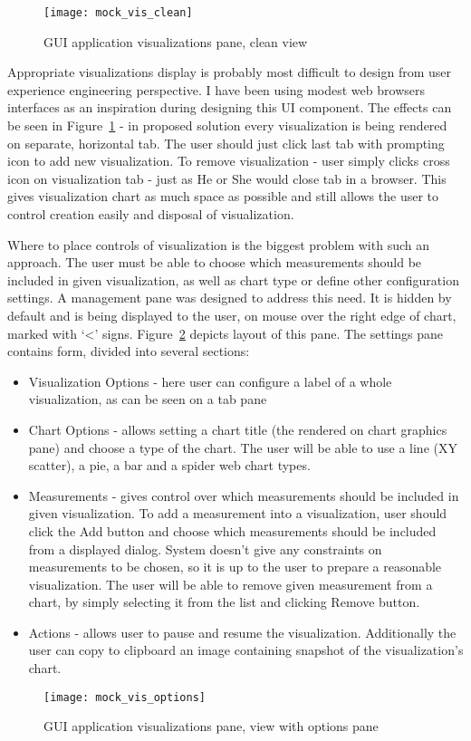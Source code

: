 \begin{figure}[ht]
\centering
\texttt{[image: mock\_vis\_clean]}
\caption{GUI application visualizations pane, clean view}
\label{fig:mock_vis_clean}
\end{figure}

Appropriate visualizations display is probably most difficult to design from user experience engineering perspective. I have been using modest web browsers interfaces as an inspiration during designing this UI component. The effects can be seen in Figure~\ref{fig:mock_vis_clean} - in proposed solution every visualization is being rendered on separate, horizontal tab. The user should just click last tab with prompting icon to add new visualization. To remove visualization - user simply clicks cross icon on visualization tab - just as He or She would close tab in a browser. This gives visualization chart as much space as possible and still allows the user to control creation easily and disposal of visualization.

Where to place controls of visualization is the biggest problem with such an approach. The user must be able to choose which measurements should be included in given visualization, as well as chart type or define other configuration settings. A management pane was designed to address this need. It is hidden by default and is being displayed to the user, on mouse over the right edge of chart, marked with \lq{}<\rq{} signs. Figure~\ref{fig:mock_vis_options} depicts layout of this pane. The settings pane contains form, divided into several sections:

\begin{itemize}

\item Visualization Options - here user can configure a label of a whole visualization, as can be seen on a tab pane

\item Chart Options - allows setting a chart title (the rendered on chart graphics pane) and choose a type of the chart. The user will be able to use a line (XY scatter), a pie, a bar and a spider web chart types.

\item Measurements - gives control over which measurements should be included in given visualization. To add a measurement into a visualization, user should click the Add button and choose which measurements should be included from a displayed dialog. System doesn't give any constraints on measurements to be chosen, so it is up to the user to prepare a reasonable visualization. The user will be able to remove given measurement from a chart, by simply selecting it from the list and clicking Remove button.

\item Actions - allows user to pause and resume the visualization. Additionally the user can copy to clipboard an image containing snapshot of the visualization's chart.
\end{itemize}

\begin{figure}[ht]
\centering
\texttt{[image: mock\_vis\_options]}
\caption{GUI application visualizations pane, view with options pane}
\label{fig:mock_vis_options}
\end{figure}

